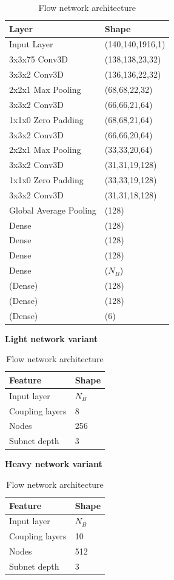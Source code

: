 \begin{table}[htbp]
\centering

\begin{minipage}[t][12.45cm]{0.48\textwidth}
\centering
\caption{CNN network architecture}
\label{tab:cnn_architecture}
\begin{tabular}{l l}
\toprule
Layer & Shape \\
\midrule
Input Layer  & (140,140,1916,1) \\
3x3x75 Conv3D  & (138,138,23,32) \\
3x3x2 Conv3D  & (136,136,22,32) \\
2x2x1 Max Pooling  & (68,68,22,32) \\
3x3x2 Conv3D  & (66,66,21,64) \\
1x1x0 Zero Padding  & (68,68,21,64) \\
3x3x2 Conv3D  & (66,66,20,64) \\
2x2x1 Max Pooling  & (33,33,20,64) \\
3x3x2 Conv3D  & (31,31,19,128) \\
1x1x0 Zero Padding  & (33,33,19,128) \\
3x3x2 Conv3D  & (31,31,18,128) \\
Global Average Pooling  & (128) \\
Dense  & (128) \\
Dense  & (128) \\
Dense  & (128) \\
Dense  & ($N_B$) \\
\midrule
(Dense) & (128) \\
(Dense) & (128) \\
(Dense) & (6) \\
\bottomrule
\end{tabular}
\end{minipage}
\hfill
\begin{minipage}[t][11.73cm]{0.48\textwidth}
\centering
\caption{Flow network architecture}
\label{tab:flow_architecture}
\textbf{Light network variant}
\begin{tabular}{l l}
\toprule
Feature & Shape \\
\midrule
Input layer & $N_B$ \\
Coupling layers & 8 \\
Nodes & 256 \\
Subnet depth & 3 \\
\bottomrule
\end{tabular}
\vfill
\textbf{Heavy network variant}
\begin{tabular}{l l}
\toprule
Feature & Shape \\
\midrule
Input layer & $N_B$ \\
Coupling layers & 10 \\
Nodes & 512 \\
Subnet depth & 3 \\
\bottomrule
\end{tabular}
\end{minipage}
\end{table}

